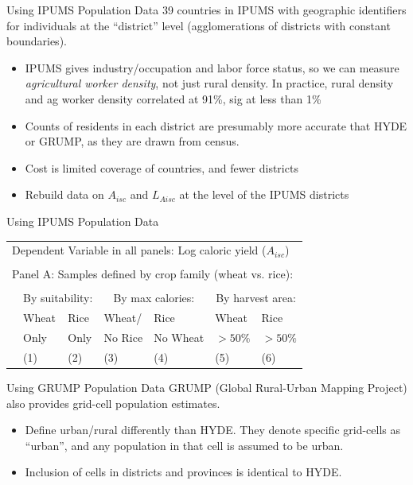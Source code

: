 \documentclass[10pt, xcolor=dvipsnames]{beamer}
\begin{document}
\begin{frame}{Using IPUMS Population Data}\label{ipums}
39 countries in IPUMS with geographic identifiers for individuals at the ``district'' level (agglomerations of districts with constant boundaries). 
\begin{itemize}
  \item IPUMS gives industry/occupation and labor force status, so we can measure \textit{agricultural worker density}, not just rural density. In practice, rural density and ag worker density correlated at 91\%, sig at less than 1\%
  \item Counts of residents in each district are presumably more accurate that HYDE or GRUMP, as they are drawn from census. 
  \item Cost is limited coverage of countries, and fewer districts
  \item Rebuild data on $A_{isc}$ and $L_{Aisc}$ at the level of the IPUMS districts
\end{itemize}

\end{frame}

\begin{frame}{Using IPUMS Population Data}

{\footnotesize
\begin{tabularx}{\textwidth}{lXXXXXX}
\midrule
\multicolumn{7}{l}{Dependent Variable in all panels: Log caloric yield ($A_{isc}$)} \\ \\
\multicolumn{7}{l}{Panel A: Samples defined by crop family (wheat vs. rice):} \\ \\
 & \multicolumn{2}{c}{By suitability:} & \multicolumn{2}{c}{By max calories:} & \multicolumn{2}{c}{By harvest area:}\\ \cmidrule(lr){2-3} \cmidrule(lr){4-5} \cmidrule(lr){6-7} 
 & Wheat & Rice & Wheat/  & Rice  & Wheat  & Rice \\
 & Only & Only &  No Rice & No Wheat & $>50\%$ & $>50\%$   \\
 & (1) & (2) & (3) & (4) & (5) & (6) \\
\midrule

\midrule
\end{tabularx}
}

\hfill \hyperlink{robustness}{}
\end{frame}

\begin{frame}{Using GRUMP Population Data}\label{grump}
GRUMP (Global Rural-Urban Mapping Project) also provides grid-cell population estimates. 
\begin{itemize}
  \item Define urban/rural differently than HYDE. They denote specific grid-cells as ``urban'', and any population in that cell is assumed to be urban.
  \item Inclusion of cells in districts and provinces is identical to HYDE. 
\end{itemize}
\end{frame}
\end{document}
